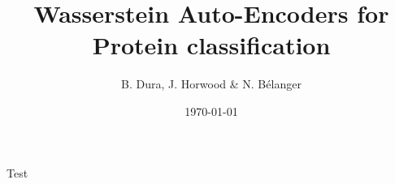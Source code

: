 \documentclass[11pt, letterpaper]{article}
\title{Wasserstein Auto-Encoders for Protein classification}
\author{B. Dura, J. Horwood \& N. Bélanger}
\date{\today}
\begin{document}
\maketitle

Test
\end{document}
